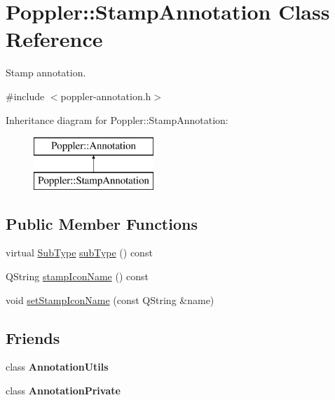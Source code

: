 \hypertarget{class_poppler_1_1_stamp_annotation}{}\section{Poppler\+:\+:Stamp\+Annotation Class Reference}
\label{class_poppler_1_1_stamp_annotation}


Stamp annotation.  




{\ttfamily \#include $<$poppler-\/annotation.\+h$>$}

Inheritance diagram for Poppler\+:\+:Stamp\+Annotation\+:\begin{figure}[H]
\begin{center}
\leavevmode
\includegraphics[height=2.000000cm]{class_poppler_1_1_stamp_annotation}
\end{center}
\end{figure}
\subsection*{Public Member Functions}
\begin{DoxyCompactItemize}
\item 
virtual \hyperlink{class_poppler_1_1_annotation_a2d592999c330949d64679cfa9e81113f}{Sub\+Type} \hyperlink{class_poppler_1_1_stamp_annotation_ad4140dc18ea7dfc4b844afc1d0abdf74}{sub\+Type} () const
\item 
Q\+String \hyperlink{class_poppler_1_1_stamp_annotation_aeacae1f94260e47ff079e2c8a8dd636e}{stamp\+Icon\+Name} () const
\item 
void \hyperlink{class_poppler_1_1_stamp_annotation_adb78400f376919308721d34e396e82dc}{set\+Stamp\+Icon\+Name} (const Q\+String \&name)
\end{DoxyCompactItemize}
\subsection*{Friends}
\begin{DoxyCompactItemize}
\item 
\mbox{\label{class_poppler_1_1_stamp_annotation_a13daac1cbc1823e18498579fc26b344f}} 
class {\bfseries Annotation\+Utils}
\item 
\mbox{\label{class_poppler_1_1_stamp_annotation_add0bc3e32e560f9e9eb3025587c1ad54}} 
class {\bfseries Annotation\+Private}
\end{DoxyCompactItemize}
